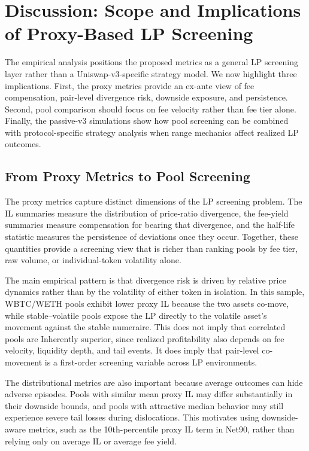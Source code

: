 \documentclass[anonymous]{lipics-v2021}
\begin{document}
{\section{Discussion: Scope and Implications of Proxy-Based LP Screening}
\label{sec:discussion}

The empirical analysis positions the proposed metrics as a general LP screening layer rather than a Uniswap-v3-specific strategy model. 
We now highlight three implications. 
First, the proxy metrics provide an ex-ante view of fee compensation, pair-level divergence risk, downside exposure, and persistence. 
Second, pool comparison should focus on fee velocity rather than fee tier alone. 
Finally, the passive-v3 simulations show how pool screening can be combined with protocol-specific strategy analysis when range mechanics affect realized LP outcomes.

\subsection{From Proxy Metrics to Pool Screening}

The proxy metrics capture distinct dimensions of the LP screening problem. 
The IL summaries measure the distribution of price-ratio divergence, the fee-yield summaries measure compensation for bearing that divergence, and the half-life statistic measures the persistence of deviations once they occur. 
Together, these quantities provide a screening view that is richer than ranking pools by fee tier, raw volume, or individual-token volatility alone.

The main empirical pattern is that divergence risk is driven by relative price dynamics rather than by the volatility of either token in isolation. 
In this sample, WBTC/WETH pools exhibit lower proxy IL because the two assets co-move, while stable--volatile pools expose the LP directly to the volatile asset's movement against the stable numeraire. 
This does not imply that correlated pools are Inherently superior, since realized profitability also depends on fee velocity, liquidity depth, and tail events. 
It does imply that pair-level co-movement is a first-order screening variable across LP environments.

The distributional metrics are also important because average outcomes can hide adverse episodes. 
Pools with similar mean proxy IL may differ substantially in their downside bounds, and pools with attractive median behavior may still experience severe tail losses during dislocations. 
This motivates using downside-aware metrics, such as the 10th-percentile proxy IL term in Net90, rather than relying only on average IL or average fee yield.

}
\end{document}
